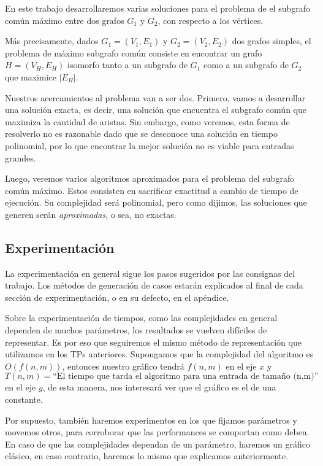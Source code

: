 
En este trabajo desarrollaremos varias soluciones para el problema de el subgrafo común máximo entre dos grafos $G_1$ y $G_2$, con respecto a los vértices. 

Más precisamente, dados $G_1 = (V_1 , E_1)$ y $G_2 = (V_2 , E_2)$ dos grafos simples, el problema de máximo subgrafo común consiste en encontrar un grafo $H = (V_H , E_H)$ isomorfo tanto a un subgrafo de $G_1$ como a un subgrafo de $G_2$ que maximice $|E_H|$.

Nuestros acercamientos al problema van a ser dos. Primero, vamos a desarrollar una solución exacta, es decir, una solución que encuentra el subgrafo común que maximiza la cantidad de aristas.
Sin embargo, como veremos, esta forma de resolverlo no es razonable dado que se desconoce una solución en tiempo polinomial, por lo que encontrar la mejor solución no es viable para entradas grandes.

Luego, veremos varios algoritmos aproximados para el problema del subgrafo común máximo. Estos consisten en sacrificar exactitud a cambio de tiempo de ejecución. Su complejidad será polinomial, pero como dijimos, las soluciones que generen serán \emph{aproximadas}, o sea, no exactas.


\subsection{Experimentación}

La experimentación en general sigue los pasos sugeridos por las consignas del trabajo. Los métodos de generación de casos estarán explicados al final de cada sección de experimentación, o en su defecto, en el apéndice.

Sobre la experimentación de tiempos, como las complejidades en general dependen de muchos parámetros, los resultados se vuelven difíciles de representar.
Es por eso que seguiremos el mismo método de representación que utilizamos en los TPs anteriores.
Supongamos que la complejidad del algoritmo es $O(f(n,m))$, entonces nuestro gráfico tendrá $f(n, m)$ en el eje $x$ y $T(n, m) = \text{``El tiempo que tarda el algoritmo para una entrada de tamaño (n,m)''}$ en el eje $y$, de esta manera, nos interesará ver que el gráfico es el de una constante.

Por supuesto, también haremos experimentos en los que fijamos parámetros y movemos otros, para corroborar que las performances se comportan como deben. En caso de que las complejidades dependan de un parámetro, haremos un gráfico clásico, en caso contrario, haremos lo mismo que explicamos anteriormente.



